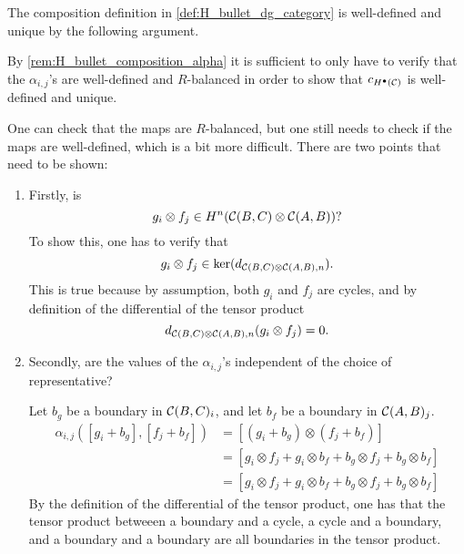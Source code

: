 \begin{remark}
    \label{rem:composition_in_H_bullet_is_well_defined}
    The composition definition in \autoref{def:H_bullet_dg_category} is well-defined and unique by the following argument.

    By \autoref{rem:H_bullet_composition_alpha} it is sufficient to only have to verify that the \( \alpha_{i, j} \)'s are well-defined and \( R \)-balanced in order to show that \( c_{H^\bullet({\mathcal{C}})} \) is well-defined and unique.

    One can check that the maps are \( R \)-balanced, but one still needs to check if the maps are well-defined, which is a bit more difficult. There are two points that need to be shown:
    \begin{enumerate}
        \item {
            Firstly, is
            \[
                g_i \otimes f_j \in H^n({\mathcal{C}}(B, C) \otimes {\mathcal{C}}(A, B))?
            \]
            To show this, one has to verify that
            \[
                g_i \otimes f_j \in \ker(d_{{\mathcal{C}}(B, C) \otimes {\mathcal{C}}(A, B), n}).
            \]
            This is true because by assumption, both \( g_i \) and \( f_j \) are cycles, and by definition of the differential of the tensor product
            \[
                d_{{\mathcal{C}}(B, C) \otimes {\mathcal{C}}(A, B), n}(g_i \otimes f_j) = 0.
            \]
        }
        \item {
            Secondly, are the values of the \( \alpha_{i, j} \)'s independent of the choice of representative?

            Let \( b_g \) be a boundary in \( {\mathcal{C}}(B, C)_i \), and let \( b_f \) be a boundary in \( {\mathcal{C}}(A, B)_j \).
            \begin{align*}
                \alpha_{i, j}([g_i + b_g], [f_j + b_f]) &= [(g_i + b_g) \otimes (f_j + b_f)] \\
                &= [g_i \otimes f_j + g_i \otimes b_f + b_g \otimes f_j + b_g \otimes b_f] \\
                &= [g_i \otimes f_j + g_i \otimes b_f + b_g \otimes f_j + b_g \otimes b_f]
            \end{align*}
            By the definition of the differential of the tensor product, one has that the tensor product betweeen a boundary and a cycle, a cycle and a boundary, and a boundary and a boundary are all boundaries in the tensor product.

}
\end{enumerate}
\end{remark}
